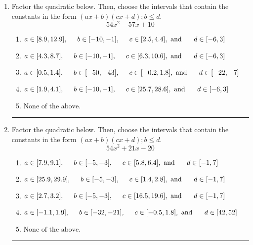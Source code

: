 \documentclass[14pt]{extbook}
\newcommand{\litem}[1]{\item#1\hspace*{-1cm}\rule{\textwidth}{0.4pt}}
\begin{document}
\begin{enumerate}
{\begin{enumerate}[label=\Alph*.]
\end{enumerate} }
\litem{
Factor the quadratic below. Then, choose the intervals that contain the constants in the form $(ax+b)(cx+d); b \leq d.$\[ 54x^{2} -57 x + 10 \]\begin{enumerate}[label=\Alph*.]
\item \( a \in [8.9, 12.9], \hspace*{5mm} b \in [-10, -1], \hspace*{5mm} c \in [2.5, 4.4], \text{ and } \hspace*{5mm} d \in [-6, 3] \)
\item \( a \in [4.3, 8.7], \hspace*{5mm} b \in [-10, -1], \hspace*{5mm} c \in [6.3, 10.6], \text{ and } \hspace*{5mm} d \in [-6, 3] \)
\item \( a \in [0.5, 1.4], \hspace*{5mm} b \in [-50, -43], \hspace*{5mm} c \in [-0.2, 1.8], \text{ and } \hspace*{5mm} d \in [-22, -7] \)
\item \( a \in [1.9, 4.1], \hspace*{5mm} b \in [-10, -1], \hspace*{5mm} c \in [25.7, 28.6], \text{ and } \hspace*{5mm} d \in [-6, 3] \)
\item \( \text{None of the above.} \)

\end{enumerate} }
\litem{
Factor the quadratic below. Then, choose the intervals that contain the constants in the form $(ax+b)(cx+d); b \leq d.$\[ 54x^{2} +21 x -20 \]\begin{enumerate}[label=\Alph*.]
\item \( a \in [7.9, 9.1], \hspace*{5mm} b \in [-5, -3], \hspace*{5mm} c \in [5.8, 6.4], \text{ and } \hspace*{5mm} d \in [-1, 7] \)
\item \( a \in [25.9, 29.9], \hspace*{5mm} b \in [-5, -3], \hspace*{5mm} c \in [1.4, 2.8], \text{ and } \hspace*{5mm} d \in [-1, 7] \)
\item \( a \in [2.7, 3.2], \hspace*{5mm} b \in [-5, -3], \hspace*{5mm} c \in [16.5, 19.6], \text{ and } \hspace*{5mm} d \in [-1, 7] \)
\item \( a \in [-1.1, 1.9], \hspace*{5mm} b \in [-32, -21], \hspace*{5mm} c \in [-0.5, 1.8], \text{ and } \hspace*{5mm} d \in [42, 52] \)
\item \( \text{None of the above.} \)


\end{enumerate}}
\end{enumerate}
\end{document}
